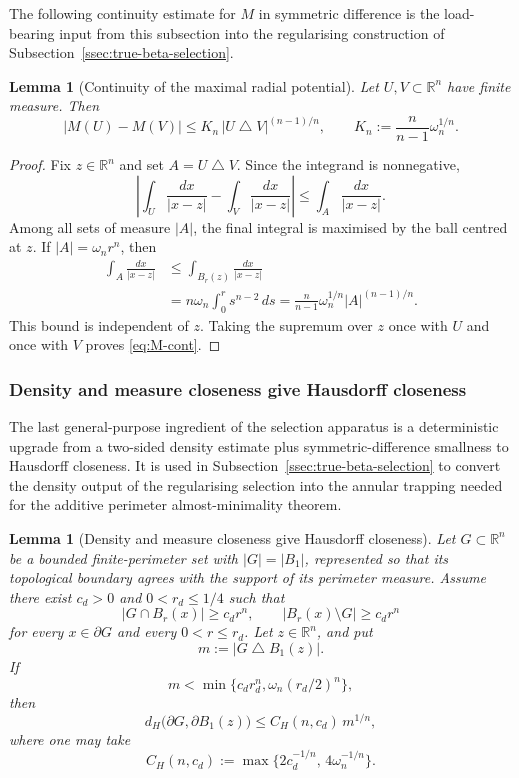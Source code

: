 \documentclass[11pt]{amsart}
\newtheorem{lemma}[theorem]{Lemma}
\theoremstyle{definition}
\newcommand{\R}{\mathbb R}
\begin{document}
The following continuity estimate for \(M\) in symmetric difference is the
load-bearing input from this subsection into the regularising construction
of Subsection~\ref{ssec:true-beta-selection}.

\begin{lemma}[Continuity of the maximal radial potential]\label{lem:M-cont}
Let \(U,V\subset\R^n\) have finite measure.  Then
\[
   |M(U)-M(V)|
   \le K_n\,|U\mathbin{\triangle}V|^{(n-1)/n},
   \qquad
   K_n:=\frac{n}{n-1}\omega_n^{1/n}.
\tag{4.9}\label{eq:M-cont}
\]
\end{lemma}

\begin{proof}
Fix \(z\in\R^n\) and set \(A=U\mathbin{\triangle}V\).  Since the integrand
is nonnegative,
\[
   \left|\int_U\frac{dx}{|x-z|}
          -\int_V\frac{dx}{|x-z|}\right|
   \le\int_A\frac{dx}{|x-z|}.
\]
Among all sets of measure \(|A|\), the final integral is maximised by the
ball centred at \(z\).  If \(|A|=\omega_n r^n\), then
\[
\begin{aligned}
   \int_A\frac{dx}{|x-z|}
   &\le\int_{B_r(z)}\frac{dx}{|x-z|} \\
   &=n\omega_n\int_0^r s^{n-2}\,ds
     =\frac{n}{n-1}\omega_n^{1/n}|A|^{(n-1)/n}.
\end{aligned}
\]
This bound is independent of \(z\).  Taking the supremum over \(z\) once
with \(U\) and once with \(V\) proves \eqref{eq:M-cont}.
\end{proof}

\subsubsection{Density and measure closeness give Hausdorff closeness}

The last general-purpose ingredient of the selection apparatus is a
deterministic upgrade from a two-sided density estimate plus
symmetric-difference smallness to Hausdorff closeness.  It is used in
Subsection~\ref{ssec:true-beta-selection} to convert the density output of
the regularising selection into the annular trapping needed for the
additive perimeter almost-minimality theorem.

\begin{lemma}[Density and measure closeness give Hausdorff closeness]
\label{lem:FJ-density-Hausdorff}
Let \(G\subset\R^n\) be a bounded finite-perimeter set with
\(|G|=|B_1|\), represented so that its topological boundary agrees with
the support of its perimeter measure.  Assume there exist \(c_d>0\) and
\(0<r_d\le1/4\) such that
\[
   |G\cap B_r(x)|\ge c_d r^n,\qquad
   |B_r(x)\setminus G|\ge c_d r^n
\tag{4.31}\label{eq:density-input}
\]
for every \(x\in\partial G\) and every \(0<r\le r_d\).
Let \(z\in\R^n\), and put
\[
   m:=|G\mathbin{\triangle}B_1(z)|.
\]
If
\[
   m<\min\{c_dr_d^n,\omega_n(r_d/2)^n\},
\tag{4.32}\label{eq:m-small-H}
\]
then
\[
   d_H\bigl(\partial G,\partial B_1(z)\bigr)
   \le C_H(n,c_d)\,m^{1/n},
\tag{4.33}\label{eq:hausdorff-from-measure}
\]
where one may take
\[
   C_H(n,c_d):=\max\{2c_d^{-1/n},\,4\omega_n^{-1/n}\}.
\tag{4.34}\label{eq:CH}
\]
\end{lemma}
\end{document}
